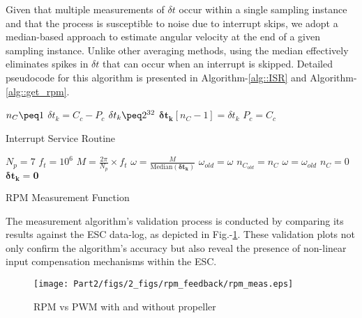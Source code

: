 Given that multiple measurements of $\delta t$ occur within a single sampling
instance and that the process is susceptible to noise due to interrupt skips,
we adopt a median-based approach to estimate angular velocity at the end of a
given sampling instance. Unlike other averaging methods, using the median
effectively eliminates spikes in $\delta t$ that can occur when an interrupt is
skipped. Detailed pseudocode for this algorithm is presented in
Algorithm-\ref{alg::ISR} and Algorithm-\ref{alg::get_rpm}.

\begin{minipage}{0.49\textwidth}
\LinesNumbered
\begin{algorithm}[H]
    \footnotesize
    $n_C \peq 1$\;
    $\delta t_k = C_c - P_c$\;
        {
         $\delta t_k \peq 2^{32}$}
    $\pmb{\delta t_k} [n_C-1] =  \delta t_k$\;
    $P_c = C_c$
    \caption{\small Interrupt Service Routine}
    \label{alg::ISR}
\end{algorithm}
\end{minipage}
\begin{minipage}{0.49\textwidth}
\LinesNumbered
\begin{algorithm}[H]
    \footnotesize
    $N_p = 7$\;
    $f_t = 10^6$\;
    $M = \frac{2 \pi}{N_p} \times f_t$\;
        {
         $\omega = \frac{M}{\text{Median}(\pmb{\delta t_k})}$\;
         $ \omega_{old} = \omega$\;
         $n_{C_{old}} = n_C$\;
        }
         {$\omega = \omega_{old}$}
    $n_C = 0$
    $\pmb{\delta t_k} = \pmb 0$\;
    \caption{\small RPM Measurement Function}
    \label{alg::get_rpm}
\end{algorithm}
\end{minipage}

The measurement algorithm's validation process is conducted by comparing its results against the ESC data-log, as depicted in Fig.-\ref{fig::valid}. These validation plots not only confirm the algorithm's accuracy but also reveal the presence of non-linear input compensation mechanisms within the ESC.
\begin{figure}[H]
    \centering
    \texttt{[image: Part2/figs/2\_figs/rpm\_feedback/rpm\_meas.eps]}
    \caption{RPM vs PWM with and without propeller}
    \label{fig::valid}
\end{figure}

